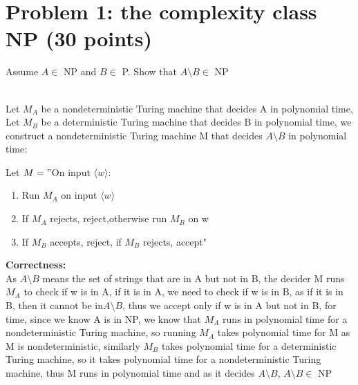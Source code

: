 \documentclass[a4paper,addpoints
	]{exam}
\begin{document}
\section*{Problem 1: the complexity class NP (30 points)}
\begin{questions}
	\question[15] Assume $A \in$ NP and $B \in$ P. Show that $A \setminus B \in$ NP
	\begin{solutionbox}{} \\
	Let $M_A$ be a nondeterministic Turing machine that decides A in polynomial time,
	Let $M_B$ be a deterministic Turing machine that decides B in polynomial time,
	we construct a nondeterministic Turing machine M that decides $A \setminus B$ in polynomial time:
	
	
	Let $M="$On input $\langle w\rangle$:
	\begin{enumerate}
		\item Run $M_A$ on input $\langle w\rangle$
		\item If $M_A$ rejects, reject,otherwise run $M_B$ on w 
		\item If $M_B$ accepts, reject, if $M_B$ rejects, accept"
	\end{enumerate}

    \vspace{2em}

    \textbf{\large Correctness:} \\
	 As $A \setminus B$ means the set of strings that are in A but not in B,
	 the decider M runs $M_A$ to check if w is in A, if it is in A,
	 we need to check if w is in B, as if it is in B, then it cannot be in$A \setminus B$,
	 thus we accept only if w is in A but not in B, for time, since we know A is in NP,
	 we know that $M_A$ runs in polynomial time for a nondeterministic Turing machine, so running $M_A$ takes polynomial time for M as M is nondeterministic,
	 similarly $M_B$ takes polynomial time for a deterministic Turing machine,
	 so it takes polynomial time for a nondeterministic Turing machine, thus M runs in polynomial time and as it decides $A \setminus B$, $A \setminus B \in $ NP  
    

\end{solutionbox}
\end{questions}
\end{document}
